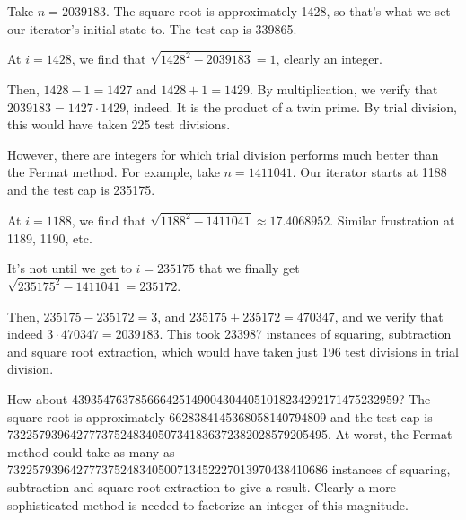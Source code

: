 \documentclass[12pt]{article}
\begin{document}
Take $n = 2039183$. The square root is approximately 1428, so that's what we set our iterator's initial state to. The test cap is 339865.

At $i = 1428$, we find that $\sqrt{1428^2 - 2039183} = 1$, clearly an integer.

Then, $1428 - 1 = 1427$ and $1428 + 1 = 1429$. By multiplication, we verify that $2039183 = 1427 \cdot 1429$, indeed. It is the product of a twin prime. By trial division, this would have taken 225 test divisions.

However, there are integers for which trial division performs much better than the Fermat method. For example, take $n = 1411041$. Our iterator starts at 1188 and the test cap is 235175.

At $i = 1188$, we find that $\sqrt{1188^2 - 1411041} \approx 17.4068952$. Similar frustration at 1189, 1190, etc.

It's not until we get to $i = 235175$ that we finally get $\sqrt{235175^2 - 1411041} = 235172$.

Then, $235175 - 235172 = 3$, and $235175 + 235172 = 470347$, and we verify that indeed $3 \cdot 470347 = 2039183$. This took 233987 instances of squaring, subtraction and square root extraction, which would have taken just 196 test divisions in trial division.

How about 4393547637856664251490043044051018234292171475232959? The square root is approximately 6628384145368058140794809 and the test cap is 732257939642777375248340507341836372382028579205495. At worst, the Fermat method could take as many as 732257939642777375248340500713452227013970438410686 instances of squaring, subtraction and square root extraction to give a result. Clearly a more sophisticated method is needed to factorize an integer of this magnitude.
\end{document}
